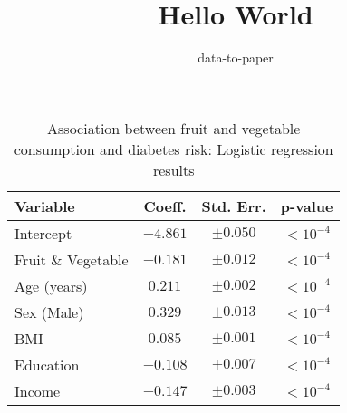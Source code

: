\documentclass[12pt]{article}
\title{Hello World}
\author{data-to-paper}
\begin{document}
\maketitle

\begin{table}[!htbp]
\centering
\caption{Association between fruit and vegetable consumption and diabetes risk: Logistic regression results}
\label{table2}
\begin{tabular}{l c c c}
\toprule
\textbf{Variable}  & \textbf{Coeff.} & \textbf{Std. Err.} & \textbf{p-value} \\
\midrule
Intercept          & $-4.861$        & $\pm 0.050$        & $<10^{-4}$    \\
Fruit \& Vegetable & $-0.181$        & $\pm 0.012$        & $<10^{-4}$    \\
Age (years)        & $0.211$         & $\pm 0.002$        & $<10^{-4}$    \\
Sex (Male)         & $0.329$         & $\pm 0.013$        & $<10^{-4}$    \\
BMI                & $0.085$         & $\pm 0.001$        & $<10^{-4}$    \\
Education          & $-0.108$        & $\pm 0.007$        & $<10^{-4}$    \\
Income             & $-0.147$        & $\pm 0.003$        & $<10^{-4}$    \\
\bottomrule
\end{tabular}
\end{table}
\end{document}
